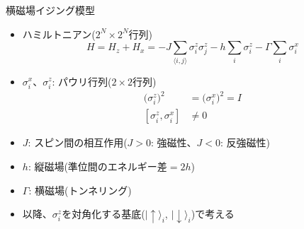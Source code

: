 \begin{frame}[t,fragile]{横磁場イジング模型}
  \begin{itemize}
  \item ハミルトニアン($2^N \times 2^N$行列)
    \[
      H = H_z + H_x = - J \sum_{\langle i,j \rangle} \sigma_i^z \sigma_j^z - h \sum_i \sigma_i^z - \Gamma \sum_i \sigma_i^x
    \]
  \item $\sigma_i^x$、$\sigma_i^z$: パウリ行列($2 \times 2$行列)
    \begin{align*}
      \big(\sigma_i^z\big)^2 &= \big(\sigma_i^x\big)^2 = I \\
      [ \sigma_i^z, \sigma_i^x ] &\ne 0
    \end{align*}
  \item $J$: スピン間の相互作用($J>0$: 強磁性、$J<0$: 反強磁性)
  \item $h$: 縦磁場(準位間のエネルギー差$=2h$)
  \item $\Gamma$: 横磁場(トンネリング)
  \item 以降、$\sigma_i^z$を対角化する基底($|\!\uparrow\rangle_i$, $|\!\downarrow\rangle_i$)で考える
  \end{itemize}
\end{frame}
